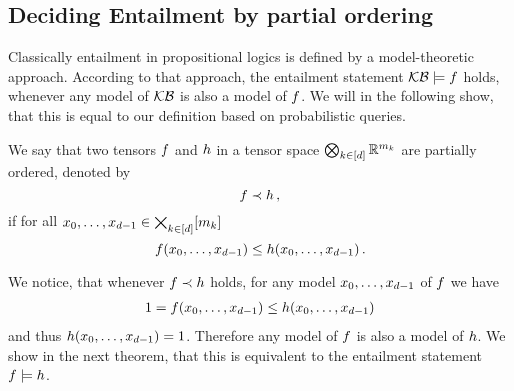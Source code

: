 %












\subsection{Deciding Entailment by partial ordering}

Classically entailment in propositional logics is defined by a model-theoretic approach.
According to that approach, the entailment statement $\mathcal{KB}\models f$ holds, whenever any model of $\mathcal{KB}$ is also a model of $f$.
We will in the following show, that this is equal to our definition based on probabilistic queries.


\begin{definition}\label{def:partialFTOrder}
	We say that two tensors $f$ and $h$ in a tensor space $\bigotimes_{k\in[d]} \mathbb{R}^{m_{k}}$ are partially ordered, denoted by
		\[ {f}\prec{h} \, , \]
	if for all $x_{0},\ldots,x_{d-1}\in\bigtimes_{k\in[d]}[m_{k}]$
		\[ {f}(x_{0},\ldots,x_{d-1}) \leq {h}(x_{0},\ldots,x_{d-1}) \, .\]
\end{definition}

We notice, that whenever ${f} \prec{h}$ holds, for any model ${x_{0},\ldots,x_{d-1}}$ of $f$ we have
\begin{align*}
	1 = f({x_{0},\ldots,x_{d-1}}) \leq h({x_{0},\ldots,x_{d-1}})
\end{align*}
and thus $h({x_{0},\ldots,x_{d-1}})=1$.
Therefore any model of $f$ is also a model of $h$.
We show in the next theorem, that this is equivalent to the entailment statement $f\models h$.

